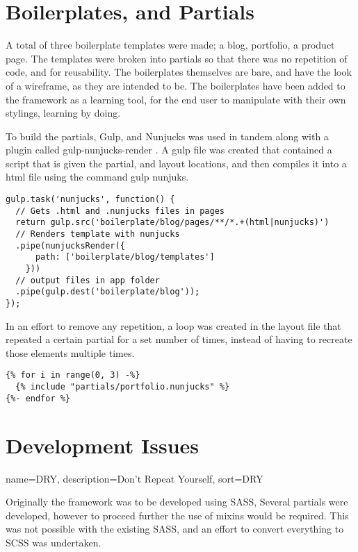 \newpage
{}
\section*{Boilerplates, and Partials}

A total of three boilerplate templates were made; a blog, portfolio, a product page. The templates were broken into partials so that there was no repetition of code, and for reusability. The boilerplates themselves are bare, and have the look of a wireframe, as they are intended to be. The boilerplates have been added to the framework as a learning tool, for the end user to manipulate with their own stylings, learning by doing. 

To build the partials, Gulp, and Nunjucks was used in tandem along with a plugin called gulp-nunjucks-render \citep{PLUG17} . A gulp file was created that contained a script that is given the partial, and layout locations, and then compiles it into a html file using the command gulp nunjuks.

\begin{lstlisting}[language=CSS3]
gulp.task('nunjucks', function() {
  // Gets .html and .nunjucks files in pages
  return gulp.src('boilerplate/blog/pages/**/*.+(html|nunjucks)')
  // Renders template with nunjucks
  .pipe(nunjucksRender({
      path: ['boilerplate/blog/templates']
    }))
  // output files in app folder
  .pipe(gulp.dest('boilerplate/blog'));
});

\end{lstlisting}


In an effort to remove any repetition, a loop was created in the layout file that repeated a certain partial for a set number of times, instead of having to recreate those elements multiple times. 

\begin{lstlisting}[language=CSS3]
{% for i in range(0, 3) -%}
  {% include "partials/portfolio.nunjucks" %}
{%- endfor %}
\end{lstlisting}


\newpage
\section*{Development Issues}

{
  name={DRY},
  description={Don't Repeat Yourself},
  sort=DRY
}

Originally the framework was to be developed using \gls{SASS}, Several partials were developed, however to proceed further the use of \gls{mixins} would be required. This was not possible with the existing \gls{SASS}, and an effort to convert everything to \gls{SCSS} was undertaken.
 
